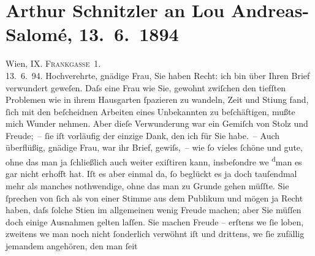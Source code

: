 

               \section[Arthur Schnitzler an Lou Andreas-Salomé, 13. 6. 1894]{ Arthur Schnitzler an Lou Andreas-Salomé, 13. 6. 1894}\nopagebreak{}\rehead{ }\begin{ledgroupsized}[t]{13cm}\normalsize\beginnumbering{} \toendnotes[C]{\smallbreak\pagebreak[2]} 
\toendnotes[C]{\smallbreak}\pstart
           \raggedleft{}{\pb}Wien, IX. \textsc{Frankgasse 1}.{\\}13. 6. 94.\pend
           \pstart{}Hochverehrte, gnädige Frau,\pend\pstart
           Sie haben Recht: ich bin über Ihren Brief verwundert geweſen. Daſs eine Frau wie Sie,
               gewohnt zwiſchen den tiefſten Problemen wie in ihrem Hausgarten ſpazieren zu wandeln,
               Zeit und Sti{\geminationm}ung fand, ſich mit den beſcheidnen Arbeiten
               eines Unbekannten zu beſchäftigen, mußte mich Wunder nehmen. Aber dieſe Verwunderung
                  {\pb}war ein Gemiſch von Stolz und Freude; – ſie iſt vorläufig der einzige
               Dank, den ich für Sie habe. – Auch überflüßig, gnädige Frau, war ihr Brief, gewiſs, –
               wie ſo vieles ſchöne und gute, ohne das man ja ſchließlich auch weiter exiſtiren
               kann, insbeſondre we{\geminationn}{ }\substVorne{}\textsuperscript{d}\substDazwischen{}m\substHinten{}an es gar nicht erhofft hat. Iſt es aber einmal da, ſo beglückt es ja doch
               tauſendmal mehr als manches noth{\pb}wendige, ohne das man zu Grunde gehen
               müſſte. Sie ſprechen von ſich als von einer Stimme aus dem Publikum und mögen ja
               Recht haben, daſs ſolche Sti{\geminationm}en im allgemeinen wenig
               Freude machen; aber Sie müſſen doch einige Ausnahmen gelten laſſen. Sie machen Freude
               – erſtens we{\geminationn}{ }ſie loben, zweitens we{\geminationn}{ }{\pb}man noch nicht ſonderlich verwöhnt iſt und drittens, we{\geminationn}{ }ſie zufällig jemandem angehören, den man ſeit

\end{ledgroupsized}

